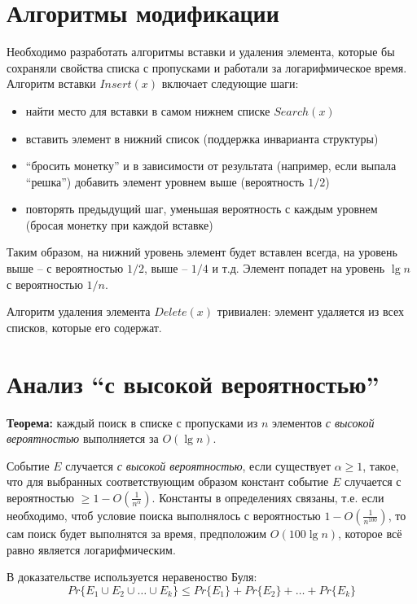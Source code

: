 \documentclass[11pt]{article}
\begin{document}
\section{Алгоритмы модификации}
Необходимо разработать алгоритмы вставки и удаления элемента, которые бы сохраняли свойства списка с пропусками и работали за логарифмическое время. Алгоритм вставки $Insert(x)$ включает следующие шаги:
\begin{itemize}
\item найти место для вставки в самом нижнем списке $Search(x)$
\item вставить элемент в нижний список (поддержка инварианта структуры)
\item ``бросить монетку'' и в зависимости от результата (например, если выпала ``решка'') добавить элемент уровнем выше (вероятность $1/2$)
\item повторять предыдущий шаг, уменьшая вероятность с каждым уровнем (бросая монетку при каждой вставке)
\end{itemize}
Таким образом, на нижний уровень элемент будет вставлен всегда, на уровень выше -- с вероятностью $1/2$, выше -- $1/4$ и т.д. Элемент попадет на уровень $\lg n$ с вероятностью $1/n$.

Алгоритм удаления элемента $Delete(x)$ тривиален: элемент удаляется из всех списков, которые его содержат.

\section{Анализ ``с высокой вероятностью''}
\textbf{Теорема:} каждый поиск в списке с пропусками из $n$ элементов \emph{с высокой вероятностью} выполняется за $O(\lg n)$.

Событие $E$ случается \emph{с высокой вероятностью}, если существует $\alpha \geqslant 1$, такое, что для выбранных соответствующим образом констант событие $E$ случается с вероятностью $\geqslant 1 - O(\frac{1}{n^{\alpha}})$. Константы в определениях связаны, т.е. если необходимо, чтоб условие поиска выполнялось с вероятностью  $1 - O(\frac{1}{n^{100}})$, то сам поиск будет выполнятся за время, предположим $O(100 \lg n)$, которое всё равно является логарифмическим.

В доказательстве используется неравеноство Буля:
\begin{equation*}
  Pr\{E_1 \cup E_2 \cup \ldots \cup E_k\} \leqslant Pr\{E_1\} + Pr\{E_2\} + \ldots + Pr\{E_k\}
\end{equation*}
\end{document}
